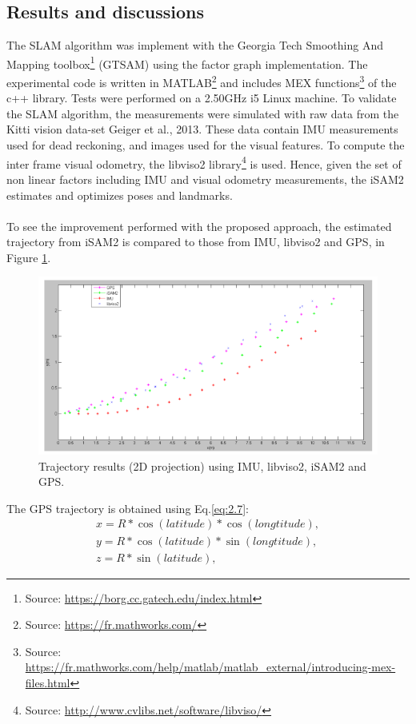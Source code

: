 \subsection{Results and discussions}
The SLAM algorithm was implement with the Georgia Tech Smoothing And Mapping toolbox\footnote{Source: \url{https://borg.cc.gatech.edu/index.html}} (GTSAM) using the factor graph implementation. The experimental code is written in MATLAB\footnote{Source: \url{https://fr.mathworks.com/}} and includes MEX functions\footnote{Source: \url{https://fr.mathworks.com/help/matlab/matlab_external/introducing-mex-files.html}} of the c++ library. Tests were performed on a 2.50GHz i5 Linux machine. To validate the SLAM algorithm, the measurements were simulated with raw data from the Kitti vision data-set Geiger et al., 2013. These data contain IMU measurements used for dead reckoning, and images used for the visual features. To compute the inter frame visual odometry, the libviso2 library\footnote{Source: \url{http://www.cvlibs.net/software/libviso/}} is used. Hence, given the set of non linear factors including IMU and visual odometry measurements, the iSAM2 estimates and optimizes poses and landmarks.\\\\
To see the improvement performed with the proposed approach, the estimated trajectory from iSAM2 is compared to those from IMU, libviso2 and GPS, in Figure \ref{fig:2.14}.
\begin{figure}[H]
    \centering
    \includegraphics[scale=0.5]{assets/2_14.png}
    \caption{Trajectory results (2D projection) using IMU, libviso2, iSAM2 and GPS.}
    \label{fig:2.14}
\end{figure}
The GPS trajectory is obtained using Eq.\ref{eq:2.7}:
\begin{equation}\label{eq:2.7}
    \begin{split}
        x=R*\cos(latitude)*\cos(longtitude), \\
        y=R*\cos(latitude)*\sin(longtitude), \\
        z=R*\sin(latitude),
    \end{split}
\end{equation}

